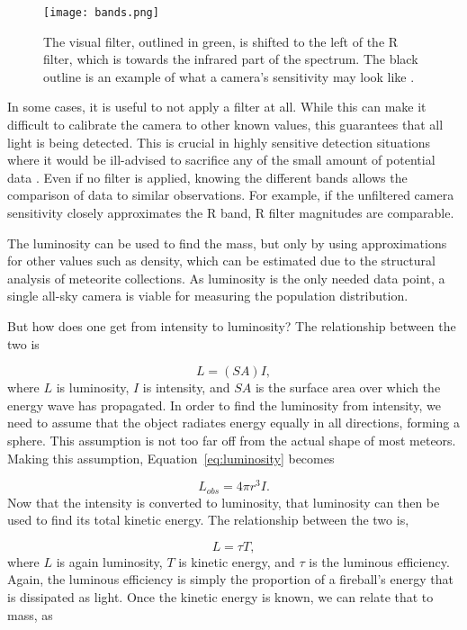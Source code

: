 \begin{figure}[ht!]
	\centering
	\texttt{[image: bands.png]}
	\caption{The visual filter, outlined in green, is shifted to the left of the R filter, which is towards the infrared part of the spectrum. The black outline is an example of what a camera's sensitivity may look like \protect\cite{Suggs2017}.}
	\label{fig:bands}
\end{figure}


In some cases, it is useful to not apply a filter at all. While this can make it difficult to calibrate the camera to other known values, this guarantees that all light is being detected. This is crucial in highly sensitive detection situations where it would be ill-advised to sacrifice any of the small amount of potential data \cite{Rembold2015}. Even if no filter is applied, knowing the different bands allows the comparison of data to similar observations. For example, if the unfiltered camera sensitivity closely approximates the R band, R filter magnitudes are comparable.

The luminosity can be used to find the mass, but only by using approximations for other values such as density, which can be estimated due to the structural analysis of meteorite collections. As luminosity is the only needed data point, a single all-sky camera is viable for measuring the population distribution.

But how does one get from intensity to luminosity? The relationship between the two is

\begin{equation}
	L = (SA)I,
	\label{eq:luminosity}
\end{equation}
where $L$ is luminosity, $I$ is intensity, and $SA$ is the surface area over which the energy wave has propagated. In order to find the luminosity from intensity, we need to assume that the object radiates energy equally in all directions, forming a sphere. This assumption is not too far off from the actual shape of most meteors. Making this assumption, Equation~\ref{eq:luminosity} becomes 

\begin{equation}
	L_{obs} = 4 \pi r^3 I.
\end{equation}
Now that the intensity is converted to luminosity, that luminosity can then be used to find its total kinetic energy. The relationship between the two is,

\begin{equation}
	L = \tau T,
	\label{eq:kinetic}
\end{equation}
where $L$ is again luminosity, $T$ is kinetic energy, and $\tau$ is the luminous efficiency. Again, the luminous efficiency is simply the proportion of a fireball's energy that is dissipated as light. Once the kinetic energy is known, we can relate that to mass, as

